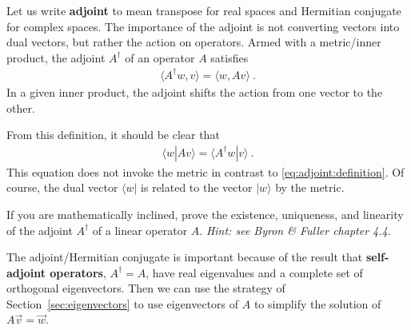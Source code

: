 Let us write \textbf{adjoint} to mean transpose for real spaces and Hermitian conjugate for complex spaces. The importance of the adjoint is not converting vectors into dual vectors, but rather the action on operators. Armed with a metric/inner product, the adjoint $A^\dag$ of an operator $A$ satisfies
\begin{align}
  \langle A^\dag w, v  \rangle
  = 
  \langle w, Av \rangle \ .
  \label{eq:adjoint:definition}
\end{align}
In a given inner product, the adjoint shifts the action from one vector to the other. 
\begin{example}
From this definition, it should be clear that
\begin{align}
  \langle w |  A v\rangle = \langle A^\dag w | v\rangle \ .
  \label{eq:wAv:Awv}
\end{align}
This equation does not invoke the metric in contrast to \eqref{eq:adjoint:definition}. Of course, the dual vector $\langle w |$ is related to the vector $|w\rangle$ by the metric.
\end{example}
\begin{exercise}
If you are mathematically inclined, prove the existence, uniqueness, and linearity of the adjoint $A^\dag$ of a linear operator $A$. \emph{Hint: see Byron \& Fuller chapter 4.4}. 
\end{exercise}

The adjoint/Hermitian conjugate is important because of the result that \textbf{self-adjoint operators}, $A^\dag = A$, have real eigenvalues and a complete set of orthogonal eigenvectors. Then we can use the strategy of Section~\ref{sec:eigenvectors} to use eigenvectors of $A$ to simplify the solution of $A\vec{v} = \vec{w}$.